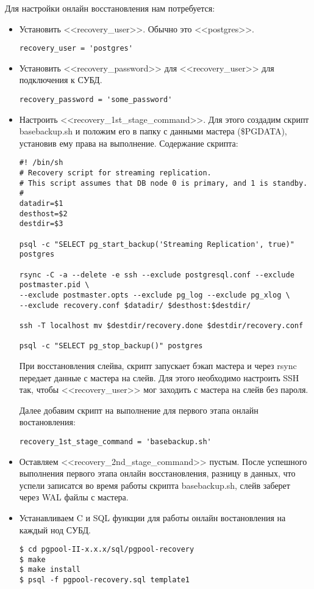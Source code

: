 Для настройки онлайн восстановления нам потребуется:
\begin{itemize}
\item Установить <<recovery\_user>>. Обычно это <<postgres>>.

\begin{lstlisting}[label=lst:pgpool42,caption=recovery\_user]
recovery_user = 'postgres'
\end{lstlisting}
\item Установить <<recovery\_password>> для <<recovery\_user>> для подключения к СУБД.

\begin{lstlisting}[label=lst:pgpool43,caption=recovery\_password]
recovery_password = 'some_password'
\end{lstlisting}

\item Настроить <<recovery\_1st\_stage\_command>>. Для этого создадим скрипт basebackup.sh 
и положим его в папку с данными мастера (\$PGDATA), установив ему права на выполнение.
Содержание скрипта:
\begin{lstlisting}[label=lst:pgpool44,caption=basebackup.sh]
#! /bin/sh
# Recovery script for streaming replication.
# This script assumes that DB node 0 is primary, and 1 is standby.
#
datadir=$1
desthost=$2
destdir=$3

psql -c "SELECT pg_start_backup('Streaming Replication', true)" postgres

rsync -C -a --delete -e ssh --exclude postgresql.conf --exclude postmaster.pid \
--exclude postmaster.opts --exclude pg_log --exclude pg_xlog \
--exclude recovery.conf $datadir/ $desthost:$destdir/

ssh -T localhost mv $destdir/recovery.done $destdir/recovery.conf

psql -c "SELECT pg_stop_backup()" postgres
\end{lstlisting}

При восстановления слейва, скрипт запускает бэкап мастера и через rsync передает данные с мастера на слейв. 
Для этого необходимо настроить SSH так, чтобы <<recovery\_user>> мог заходить с мастера на слейв без пароля.

Далее добавим скрипт на выполнение для первого этапа онлайн востановления:
\begin{lstlisting}[label=lst:pgpool45,caption=recovery\_1st\_stage\_command]
recovery_1st_stage_command = 'basebackup.sh'
\end{lstlisting}

\item Оставляем <<recovery\_2nd\_stage\_command>> пустым. После успешного выполнения первого этапа онлайн восстановления, 
разницу в данных, что успели записатся во время работы скрипта basebackup.sh, слейв заберет через WAL файлы с мастера.
\item Устанавливаем C и SQL функции для работы онлайн востановления на каждый нод СУБД.
\begin{lstlisting}[label=lst:pgpool46,caption=Устанавливаем C и SQL функции]
$ cd pgpool-II-x.x.x/sql/pgpool-recovery
$ make
$ make install
$ psql -f pgpool-recovery.sql template1
\end{lstlisting}
  

\end{itemize}
